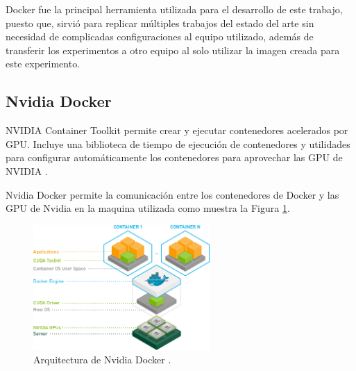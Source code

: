 Docker fue la principal herramienta utilizada para el desarrollo de este trabajo, puesto que, sirvió para replicar múltiples trabajos del estado del arte sin necesidad de complicadas configuraciones al equipo utilizado, además de transferir los experimentos a otro equipo al solo utilizar la imagen creada para este experimento.

\subsection{Nvidia Docker}

NVIDIA Container Toolkit permite crear y ejecutar contenedores acelerados por GPU. Incluye una biblioteca de tiempo de ejecución de contenedores y utilidades para configurar automáticamente los contenedores para aprovechar las GPU de NVIDIA \cite{nvidiaDocker2021overview}.

Nvidia Docker permite la comunicación entre los contenedores de Docker y las GPU de Nvidia en la maquina utilizada como muestra la Figura \ref{fig:nvidiaDocker}.

\begin{figure}[H]
    \centering
    \includegraphics[width=0.6\textwidth]{MarcoTeorico/imgs/nvidia-docker.png}
    \caption{Arquitectura de Nvidia Docker \cite{nvidiaDocker2021overview}.}
    \label{fig:nvidiaDocker}
\end{figure}

